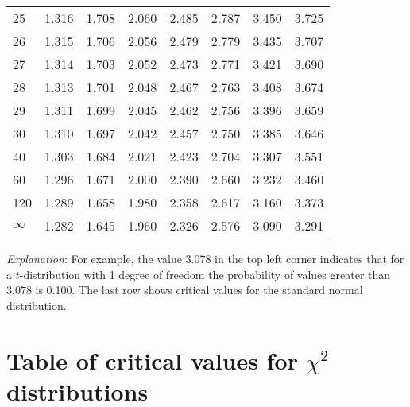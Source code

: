\begin{center}
\begin{tabular}{|l|rrrrrrr|}
25	&1.316	&1.708	&2.060	&2.485	&2.787&   3.450&  3.725\\
26	&1.315	&1.706	&2.056	&2.479	&2.779&   3.435&  3.707\\
27	&1.314	&1.703	&2.052	&2.473	&2.771&   3.421&  3.690\\
28	&1.313	&1.701	&2.048	&2.467	&2.763&   3.408&  3.674\\
29	&1.311	&1.699	&2.045	&2.462	&2.756&   3.396&  3.659\\
30	&1.310	&1.697	&2.042	&2.457	&2.750&   3.385&  3.646\\
40	&1.303	&1.684	&2.021	&2.423	&2.704&   3.307&  3.551\\
60	&1.296	&1.671	&2.000	&2.390	&2.660&   3.232&  3.460\\
120	&1.289	&1.658	&1.980	&2.358	&2.617&   3.160&  3.373\\
$\infty$
    &1.282	&1.645	&1.960	&2.326	&2.576&   3.090  & 3.291\\
\hline
\end{tabular}
\end{center}
\emph{Explanation}: For example, the value 3.078 in the top left corner
indicates that for a $t$-distribution with 1 degree of freedom the
probability of values greater than 3.078 is 0.100. The last row shows
critical values for the standard normal distribution.

\newpage


\section{Table of critical values for $\chi^{2}$ distributions}
\label{s_disttables_chi2}



